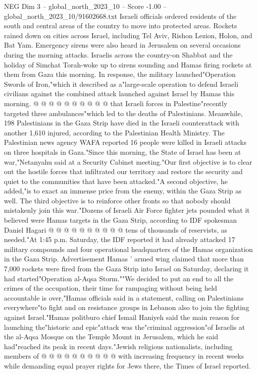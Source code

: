 \begin{textsample}{NEG Dim 3 – global\_north\_2023\_10 – Score -1.00 – global\_north\_2023\_10/91602668.txt}
Israeli officials ordered residents of the south and central areas of the country to move into protected areas.
Rockets rained down on cities across Israel, including Tel Aviv, Rishon Lezion, Holon, and Bat Yam.
Emergency sirens were also heard in Jerusalem on several occasions during the morning attacks.
Israelis across the country-on Shabbat and the holiday of Simchat Torah-woke up to sirens sounding and Hamas firing rockets at them from Gaza this morning.
In response, the military launched"Operation Swords of Iron,"which it described as a"large-scale operation to defend Israeli civilians against the combined attack launched against Israel by Hamas this morning. @ @ @ @ @ @ @ @ @ @ that Israeli forces in Palestine"recently targeted three ambulances"which led to the deaths of Palestinians.
Meanwhile, 198 Palestinians in the Gaza Strip have died in the Israeli counterattack with another 1,610 injured, according to the Palestinian Health Ministry.
The Palestinian news agency WAFA reported 16 people were killed in Israeli attacks on three hospitals in Gaza."Since this morning, the State of Israel has been at war,"Netanyahu said at a Security Cabinet meeting."Our first objective is to clear out the hostile forces that infiltrated our territory and restore the security and quiet to the communities that have been attacked."A second objective, he added,"is to exact an immense price from the enemy, within the Gaza Strip as well.
The third objective is to reinforce other fronts so that nobody should mistakenly join this war."Dozens of Israeli Air Force fighter jets pounded what it believed were Hamas targets in the Gaza Strip, according to IDF spokesman Daniel Hagari @ @ @ @ @ @ @ @ @ @ tens of thousands of reservists, as needed."At 1:45 p.m.
Saturday, the IDF reported it had already attacked 17 military compounds and four operational headquarters of the Hamas organization in the Gaza Strip.
Advertisement Hamas ' armed wing claimed that more than 7,000 rockets were fired from the Gaza Strip into Israel on Saturday, declaring it had started"Operation al-Aqsa Storm.""We decided to put an end to all the crimes of the occupation, their time for rampaging without being held accountable is over,"Hamas officials said in a statement, calling on Palestinians everywhere"to fight and on resistance groups in Lebanon also to join the fighting against Israel."Hamas politburo chief Ismail Haniyeh said the main reason for launching the"historic and epic"attack was the"criminal aggression"of Israelis at the al-Aqsa Mosque on the Temple Mount in Jerusalem, which he said had"reached its peak in recent days."Jewish religious nationalists, including members of @ @ @ @ @ @ @ @ @ @ with increasing frequency in recent weeks while demanding equal prayer rights for Jews there, the Times of Israel reported.

\end{textsample}
